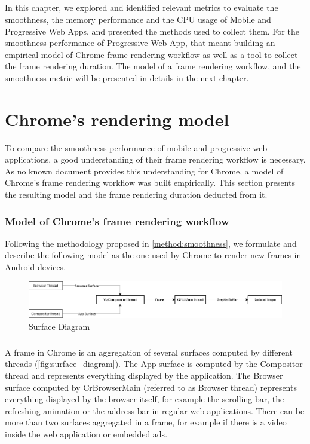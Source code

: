 \documentclass{kththesis}
\begin{document}
\paragraph{}
In this chapter, we explored and identified relevant metrics to evaluate the smoothness, the memory performance and the CPU usage of Mobile and Progressive Web Apps, and presented the methods used to collect them. For the smoothness performance of Progressive Web App, that meant building an empirical model of Chrome frame rendering workflow as well as a tool to collect the frame rendering duration. The model of a frame rendering workflow, and the smoothness metric will be presented in details in the next chapter.


\chapter{Chrome's rendering model}
\label{ch:model}
To compare the smoothness performance of mobile and progressive web applications, a good understanding of their frame rendering workflow is necessary. As no known document provides this understanding for Chrome, a model of Chrome's frame rendering workflow was built empirically. This section presents the resulting model and the frame rendering duration deducted from it. 

\subsection{Model of Chrome's frame rendering workflow}
\label{results:chrome_model}

Following the methodology proposed in \autoref{method:smoothness}, we formulate and describe the following model as the one used by Chrome to render new frames in Android devices.\newline

\begin{figure}[h]
    \centering
    \includegraphics[width=13cm]{kththesis/Figures/surface_diagram.png}
    \caption{Surface Diagram}
    \label{fig:surface_diagram}
\end{figure}

\paragraph{}
A frame in Chrome is an aggregation of several surfaces computed by different threads (\autoref{fig:surface_diagram}). The App surface is computed by the Compositor thread and represents everything displayed by the application. The Browser surface computed by CrBrowserMain (referred to as Browser thread) represents everything displayed by the browser itself, for example the scrolling bar, the refreshing animation or the address bar in regular web applications. There can be more than two surfaces aggregated in a frame, for example if there is a video inside the web application or embedded ads.
\end{document}
